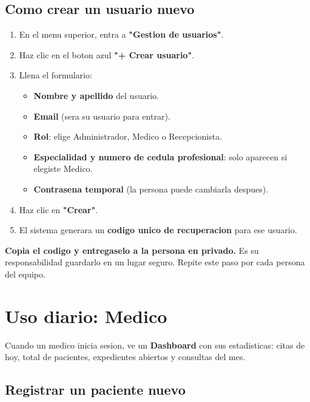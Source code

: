 \documentclass[11pt,a4paper]{article}
\begin{document}
\subsection{Como crear un usuario nuevo}

\begin{enumerate}
    \item En el menu superior, entra a \textbf{"Gestion de usuarios"}.
    \item Haz clic en el boton azul \textbf{"+ Crear usuario"}.
    \item Llena el formulario:
          \begin{itemize}
              \item \textbf{Nombre y apellido} del usuario.
              \item \textbf{Email} (sera su usuario para entrar).
              \item \textbf{Rol}: elige Administrador, Medico o Recepcionista.
              \item \textbf{Especialidad y numero de cedula profesional}: solo aparecen si elegiste Medico.
              \item \textbf{Contrasena temporal} (la persona puede cambiarla despues).
          \end{itemize}
    \item Haz clic en \textbf{"Crear"}.
    \item El sistema generara un \textbf{codigo unico de recuperacion} para ese usuario.
\end{enumerate}

\begin{cajaAlerta}
    \textbf{Copia el codigo y entregaselo a la persona en privado.} Es su responsabilidad guardarlo en un lugar seguro. Repite este paso por cada persona del equipo.
\end{cajaAlerta}

\section{Uso diario: Medico}

Cuando un medico inicia sesion, ve un \textbf{Dashboard} con sus estadisticas: citas de hoy, total de pacientes, expedientes abiertos y consultas del mes.
\subsection{Registrar un paciente nuevo}
\end{document}
